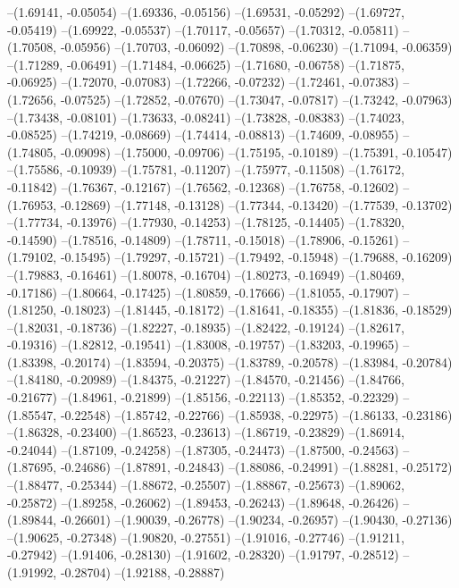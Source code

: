 --(1.69141, -0.05054)
--(1.69336, -0.05156)
--(1.69531, -0.05292)
--(1.69727, -0.05419)
--(1.69922, -0.05537)
--(1.70117, -0.05657)
--(1.70312, -0.05811)
--(1.70508, -0.05956)
--(1.70703, -0.06092)
--(1.70898, -0.06230)
--(1.71094, -0.06359)
--(1.71289, -0.06491)
--(1.71484, -0.06625)
--(1.71680, -0.06758)
--(1.71875, -0.06925)
--(1.72070, -0.07083)
--(1.72266, -0.07232)
--(1.72461, -0.07383)
--(1.72656, -0.07525)
--(1.72852, -0.07670)
--(1.73047, -0.07817)
--(1.73242, -0.07963)
--(1.73438, -0.08101)
--(1.73633, -0.08241)
--(1.73828, -0.08383)
--(1.74023, -0.08525)
--(1.74219, -0.08669)
--(1.74414, -0.08813)
--(1.74609, -0.08955)
--(1.74805, -0.09098)
--(1.75000, -0.09706)
--(1.75195, -0.10189)
--(1.75391, -0.10547)
--(1.75586, -0.10939)
--(1.75781, -0.11207)
--(1.75977, -0.11508)
--(1.76172, -0.11842)
--(1.76367, -0.12167)
--(1.76562, -0.12368)
--(1.76758, -0.12602)
--(1.76953, -0.12869)
--(1.77148, -0.13128)
--(1.77344, -0.13420)
--(1.77539, -0.13702)
--(1.77734, -0.13976)
--(1.77930, -0.14253)
--(1.78125, -0.14405)
--(1.78320, -0.14590)
--(1.78516, -0.14809)
--(1.78711, -0.15018)
--(1.78906, -0.15261)
--(1.79102, -0.15495)
--(1.79297, -0.15721)
--(1.79492, -0.15948)
--(1.79688, -0.16209)
--(1.79883, -0.16461)
--(1.80078, -0.16704)
--(1.80273, -0.16949)
--(1.80469, -0.17186)
--(1.80664, -0.17425)
--(1.80859, -0.17666)
--(1.81055, -0.17907)
--(1.81250, -0.18023)
--(1.81445, -0.18172)
--(1.81641, -0.18355)
--(1.81836, -0.18529)
--(1.82031, -0.18736)
--(1.82227, -0.18935)
--(1.82422, -0.19124)
--(1.82617, -0.19316)
--(1.82812, -0.19541)
--(1.83008, -0.19757)
--(1.83203, -0.19965)
--(1.83398, -0.20174)
--(1.83594, -0.20375)
--(1.83789, -0.20578)
--(1.83984, -0.20784)
--(1.84180, -0.20989)
--(1.84375, -0.21227)
--(1.84570, -0.21456)
--(1.84766, -0.21677)
--(1.84961, -0.21899)
--(1.85156, -0.22113)
--(1.85352, -0.22329)
--(1.85547, -0.22548)
--(1.85742, -0.22766)
--(1.85938, -0.22975)
--(1.86133, -0.23186)
--(1.86328, -0.23400)
--(1.86523, -0.23613)
--(1.86719, -0.23829)
--(1.86914, -0.24044)
--(1.87109, -0.24258)
--(1.87305, -0.24473)
--(1.87500, -0.24563)
--(1.87695, -0.24686)
--(1.87891, -0.24843)
--(1.88086, -0.24991)
--(1.88281, -0.25172)
--(1.88477, -0.25344)
--(1.88672, -0.25507)
--(1.88867, -0.25673)
--(1.89062, -0.25872)
--(1.89258, -0.26062)
--(1.89453, -0.26243)
--(1.89648, -0.26426)
--(1.89844, -0.26601)
--(1.90039, -0.26778)
--(1.90234, -0.26957)
--(1.90430, -0.27136)
--(1.90625, -0.27348)
--(1.90820, -0.27551)
--(1.91016, -0.27746)
--(1.91211, -0.27942)
--(1.91406, -0.28130)
--(1.91602, -0.28320)
--(1.91797, -0.28512)
--(1.91992, -0.28704)
--(1.92188, -0.28887)
